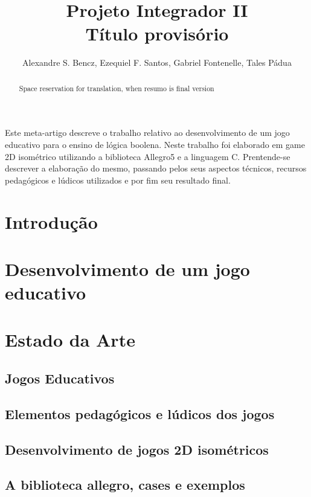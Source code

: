 \documentclass[12pt]{article}
\title{Projeto Integrador II\\ Título provisório}
\author{Alexandre S. Bencz\inst{1}, Ezequiel F. Santos\inst{1}, Gabriel Fontenelle\inst{1}, Tales Pádua\inst{1} }
\begin{document}
 

\maketitle

\begin{abstract}
Space reservation for translation, when resumo is final version %
\end{abstract}
     
\begin{resumo} 
  Este meta-artigo descreve o trabalho relativo ao desenvolvimento de 
  um jogo educativo para o ensino de lógica boolena. 
  Neste trabalho foi elaborado em game 2D isométrico utilizando
  a biblioteca Allegro5 e a linguagem C. 
  Prentende-se descrever a elaboração do mesmo, 
  passando pelos seus aspectos técnicos, recursos pedagógicos e 
  lúdicos utilizados e por fim seu resultado final.
\end{resumo}


\section{Introdução}

\section{Desenvolvimento de um jogo educativo} \label{sec:gamedev}

\section{Estado da Arte}

\subsection{Jogos Educativos}
\subsection{Elementos pedagógicos e lúdicos dos jogos}
\subsection{Desenvolvimento de jogos 2D isométricos}
\subsection{A biblioteca allegro, cases e exemplos}
\end{document}
